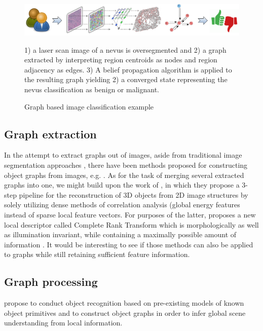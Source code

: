	\begin{figure}[ht]
		\begin{center}
			\includegraphics[width=1\textwidth]{figures/graph_img_class}
			\caption{Graph based image classification example}
			\label{fig_graph_based_img_classification}
		\end{center}
		\small
		1) a laser scan image of a nevus is oversegmented and 2) a graph extracted by interpreting region centroids as nodes and region adjacency as edges. 3) A belief propagation algorithm is applied to the resulting graph yielding 2) a converged state representing the nevus classification as benign or malignant.
	\end{figure}
		
		\subsection{Graph extraction}
		\label{ssect:graph_extraction}
	
		In the attempt to extract graphs out of images, aside from traditional image segmentation approaches \citep{FelzenszwalbHuttenlocher2004}, there have been methods proposed for constructing object graphs from images, e.g. \citep{LeeObjectGraphs2012}. As for the task of merging several extracted graphs into one, we might build upon the work of \citep{Schneevoigt2014}, in which they propose a 3-step pipeline for the reconstruction of 3D objects from 2D image structures by solely utilizing dense methods of correlation analysis (global energy features instead of sparse local feature vectors. For purposes of the latter, \citep{Demetz2013} proposes a new local descriptor called Complete Rank Transform which is morphologically as well as illumination invariant, while containing a maximally possible amount of information \citep{Bobylev2014}. It would be interesting to see if those methods can also be applied to graphs while still retaining sufficient feature information.
		
		\subsection{Graph processing}
		\label{ssect:graph_processing}
		
		\cite{LeeObjectGraphs2012} propose to conduct object recognition based on pre-existing models of known object primitives and to construct object graphs in order to infer global scene understanding from local information.
		
